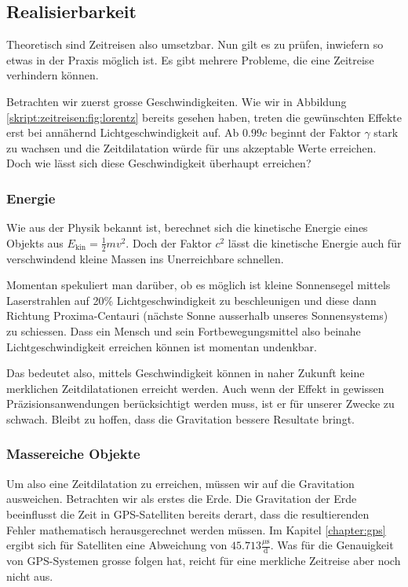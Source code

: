 \begin{refsection}
	\section{Realisierbarkeit}
    Theoretisch sind Zeitreisen also umsetzbar. Nun gilt es zu prüfen, inwiefern so etwas in der Praxis möglich ist. Es gibt mehrere Probleme, die eine Zeitreise verhindern können.
    
    Betrachten wir zuerst grosse Geschwindigkeiten. Wie wir in Abbildung \ref{skript:zeitreisen:fig:lorentz} bereits gesehen haben, treten die gewünschten Effekte erst bei annähernd Lichtgeschwindigkeit auf. Ab $0.99c$ beginnt der Faktor $\gamma$ stark zu wachsen und die Zeitdilatation würde für uns akzeptable Werte erreichen.
    Doch wie lässt sich diese Geschwindigkeit überhaupt erreichen?
    
    \subsubsection{Energie}\label{skript:chapters:zrirtreisen:energie}
    Wie aus der Physik bekannt ist, berechnet sich die kinetische Energie eines Objekts aus $E_{\text{kin}}=\frac{1}{2}mv^2$. Doch der Faktor $c^2$ lässt die kinetische Energie auch für verschwindend kleine Massen ins Unerreichbare schnellen.
    
    Momentan spekuliert man darüber, ob es möglich ist kleine Sonnensegel mittels Laserstrahlen auf 20\% Lichtgeschwindigkeit zu beschleunigen und diese dann Richtung Proxima-Centauri (nächste Sonne ausserhalb unseres Sonnensystems) zu schiessen. Dass ein Mensch und sein Fortbewegungsmittel also beinahe Lichtgeschwindigkeit erreichen können ist momentan undenkbar.
    
    Das bedeutet also, mittels Geschwindigkeit können in naher Zukunft keine merklichen Zeitdilatationen erreicht werden. Auch wenn der Effekt in gewissen Präzisionsanwendungen berücksichtigt werden muss, ist er für unserer Zwecke zu schwach. Bleibt zu hoffen, dass die Gravitation bessere Resultate bringt. 
    
    \subsubsection{Massereiche Objekte}
    Um also eine Zeitdilatation zu erreichen, müssen wir auf die Gravitation ausweichen. Betrachten wir als erstes die Erde. Die Gravitation der Erde beeinflusst die Zeit in GPS-Satelliten bereits derart, dass die resultierenden Fehler mathematisch herausgerechnet werden müssen. Im Kapitel \ref{chapter:gps} ergibt sich für Satelliten eine Abweichung von $45.713 \frac{\mu\text{s}}{\text{d}}$. Was für die Genauigkeit von GPS-Systemen grosse folgen hat, reicht für eine merkliche Zeitreise aber noch nicht aus.
    

\end{refsection}
